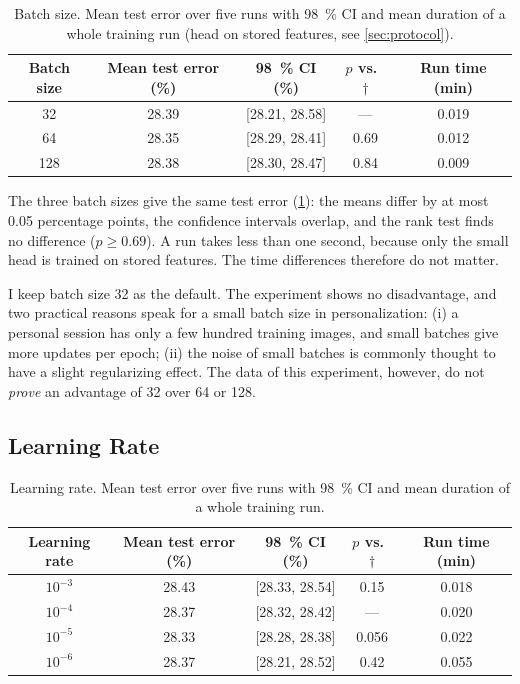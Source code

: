 \begin{table}[htbp]
  \centering
  \caption[Batch size]{Batch size. Mean test error over five runs with
           \SI{98}{\percent} CI and mean duration of a whole training run (head
           on stored features, see \cref{sec:protocol}).}
  \label{tab:batch_size}
  \small
  \begin{tabular}{ccccc}
    \toprule
    Batch size & Mean test error (\%) & \SI{98}{\percent} CI (\%) & $p$ vs.\ $\dagger$ & Run time (min) \\
    \midrule
    32\sel{}     & 28.39 & [28.21, 28.58] & ---  & 0.019 \\
    64           & 28.35 & [28.29, 28.41] & 0.69 & 0.012 \\
    128          & 28.38 & [28.30, 28.47] & 0.84 & 0.009 \\
    \bottomrule
  \end{tabular}
\end{table}

The three batch sizes give the same test error (\cref{tab:batch_size}): the
means differ by at most \num{0.05} percentage points, the confidence intervals
overlap, and the rank test finds no difference ($p\ge0.69$). A run takes less
than one second, because only the small head is trained on stored features. The
time differences therefore do not matter.

I keep batch size 32 as the default. The experiment shows no disadvantage, and
two practical reasons speak for a small batch size in personalization: (i) a
personal session has only a few hundred training images, and small batches
give more updates per epoch; (ii) the noise of small batches is commonly
thought to have a slight regularizing effect. The data of this experiment,
however, do not \emph{prove} an advantage of 32 over 64 or 128.

\subsection{Learning Rate}
\label{sec:lr}

\begin{table}[htbp]
  \centering
  \caption[Learning rate]{Learning rate. Mean test error over five runs with
           \SI{98}{\percent} CI and mean duration of a whole training run.}
  \label{tab:learning_rate}
  \small
  \begin{tabular}{ccccc}
    \toprule
    Learning rate & Mean test error (\%) & \SI{98}{\percent} CI (\%) & $p$ vs.\ $\dagger$ & Run time (min) \\
    \midrule
    $10^{-3}$          & 28.43 & [28.33, 28.54] & 0.15  & 0.018 \\
    $10^{-4}$\sel{}    & 28.37 & [28.32, 28.42] & ---   & 0.020 \\
    $10^{-5}$          & 28.33 & [28.28, 28.38] & 0.056 & 0.022 \\
    $10^{-6}$          & 28.37 & [28.21, 28.52] & 0.42  & 0.055 \\
    \bottomrule
  \end{tabular}
\end{table}

